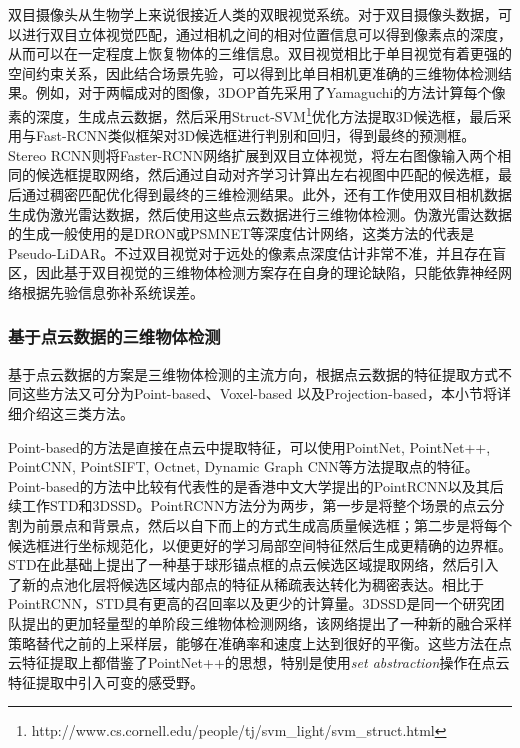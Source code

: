 双目摄像头从生物学上来说很接近人类的双眼视觉系统。对于双目摄像头数据，可以进行双目立体视觉匹配，通过相机之间的相对位置信息可以得到像素点的深度，从而可以在一定程度上恢复物体的三维信息。双目视觉相比于单目视觉有着更强的空间约束关系，因此结合场景先验，可以得到比单目相机更准确的三维物体检测结果。例如，对于两幅成对的图像，3DOP\cite{chen20183d}首先采用了Yamaguchi的方法\cite{Yamaguchi2014Efficient}计算每个像素的深度，生成点云数据，然后采用Struct-SVM\footnote{http://www.cs.cornell.edu/people/tj/svm\_light/svm\_struct.html}优化方法\cite{structSVM}提取3D候选框，最后采用与Fast-RCNN\cite{girshick2015fast}类似框架对3D候选框进行判别和回归，得到最终的预测框。Stereo RCNN\cite{licvpr2019}则将Faster-RCNN\cite{ren2015faster}网络扩展到双目立体视觉，将左右图像输入两个相同的候选框提取网络，然后通过自动对齐学习计算出左右视图中匹配的候选框，最后通过稠密匹配优化得到最终的三维检测结果。此外，还有工作使用双目相机数据生成伪激光雷达数据，然后使用这些点云数据进行三维物体检测。伪激光雷达数据的生成一般使用的是DRON\cite{DRON}或PSMNET\cite{chang2018pyramid}等深度估计网络，这类方法的代表是Pseudo-LiDAR\cite{Wang_2019_CVPR,you2020pseudolidar}。不过双目视觉对于远处的像素点深度估计非常不准，并且存在盲区，因此基于双目视觉的三维物体检测方案存在自身的理论缺陷，只能依靠神经网络根据先验信息弥补系统误差。

\subsubsection{基于点云数据的三维物体检测}

基于点云数据的方案是三维物体检测的主流方向，根据点云数据的特征提取方式不同这些方法又可分为Point-based、Voxel-based 以及Projection-based，本小节将详细介绍这三类方法。

Point-based的方法是直接在点云中提取特征，可以使用PointNet\cite{qi2017pointnet}, PointNet++\cite{qi2017pointnet++}, PointCNN\cite{PointCNN}, PointSIFT\cite{JiangPointSIFT}, Octnet\cite{RieglerOctNet}, Dynamic Graph CNN\cite{WangDynamic}等方法提取点的特征。Point-based的方法中比较有代表性的是香港中文大学提出的PointRCNN\cite{shi2019pointrcnn}以及其后续工作STD\cite{std2019yang}和3DSSD\cite{yang3DSSD20}。PointRCNN方法分为两步，第一步是将整个场景的点云分割为前景点和背景点，然后以自下而上的方式生成高质量候选框；第二步是将每个候选框进行坐标规范化，以便更好的学习局部空间特征然后生成更精确的边界框。STD在此基础上提出了一种基于球形锚点框的点云候选区域提取网络，然后引入了新的点池化层将候选区域内部点的特征从稀疏表达转化为稠密表达。相比于PointRCNN，STD具有更高的召回率以及更少的计算量。3DSSD是同一个研究团队提出的更加轻量型的单阶段三维物体检测网络，该网络提出了一种新的融合采样策略替代之前的上采样层，能够在准确率和速度上达到很好的平衡。这些方法在点云特征提取上都借鉴了PointNet++的思想，特别是使用\textit{set abstraction}操作在点云特征提取中引入可变的感受野。

